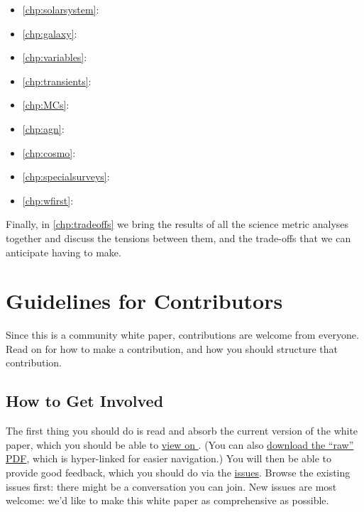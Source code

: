 \begin{itemize}
    \item \autoref{chp:solarsystem}: 
    \item \autoref{chp:galaxy}: 
    \item \autoref{chp:variables}: 
    \item \autoref{chp:transients}: 
    \item \autoref{chp:MCs}: 
    \item \autoref{chp:agn}: 
    \item \autoref{chp:cosmo}: 
    \item \autoref{chp:specialsurveys}: 
    \item \autoref{chp:wfirst}: 
\end{itemize}

Finally, in \autoref{chp:tradeoffs} we bring the results of all the
science metric analyses  together and discuss the tensions between
them, and the trade-offs that we can anticipate having to make.

\navigationbar


\section{Guidelines for Contributors}
\def\secname{guidelines}\label{sec:\secname}


Since this is a community white paper, contributions are welcome from
everyone. Read on for how to make a contribution, and how you should
structure that contribution.

\subsection{How to Get Involved}

The first thing you should do is read and absorb the current version
of the white paper, which you should be able to
\href{http://ls.st/iw2}{view on \GitHub}. (You can also
\href{https://github.com/LSSTScienceCollaborations/ObservingStrategy/raw/master/whitepaper/LSST_Observing_Strategy_White_Paper.pdf}{download
the ``raw'' PDF}, which is hyper-linked for easier navigation.) You
will then be able to provide good feedback, which you should do via
the
\href{https://github.com/LSSTScienceCollaborations/ObservingStrategy/issues}{\GitHub
issues}. Browse the existing issues first: there might be a
conversation you can  join. New issues are most welcome: we'd like to
make this white paper as comprehensive as possible.

